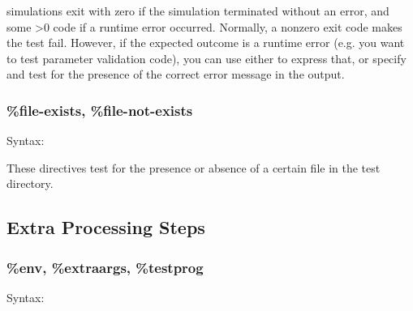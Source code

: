 {\opp} simulations exit with zero if the simulation terminated
without an error, and some >0 code if a runtime error occurred. Normally,
a nonzero exit code makes the test fail. However, if the expected outcome
is a runtime error (e.g. you want to test parameter validation code), you
can use either  to express that, or specify 
and test for the presence of the correct error message in the output.



\subsubsection{\%file-exists, \%file-not-exists}
\label{sec:testing:opptest:file-exists}

Syntax:

\begin{filelisting}
\end{filelisting}

\begin{filelisting}
\end{filelisting}

These directives test for the presence or absence of a certain file in
the test directory.

\subsection{Extra Processing Steps}
\label{sec:testing:opptest:extra-processing-steps}

\subsubsection{\%env, \%extraargs, \%testprog}
\label{sec:testing:opptest:env-extraargs-testprog}

Syntax:

\begin{filelisting}
\end{filelisting}

\begin{filelisting}
\end{filelisting}

\begin{filelisting}
\end{filelisting}

